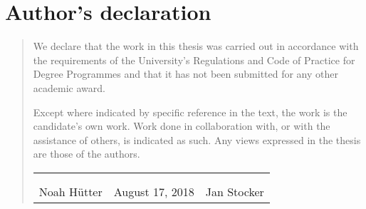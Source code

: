 \chapter*{Author's declaration}
\begin{SingleSpace}
\begin{quote}
We declare that the work in this thesis was carried out in accordance with
the requirements of the University's Regulations and Code of Practice for 
Degree Programmes and that it has not been submitted for any other
academic award.

Except where indicated by specific reference in the text, the
work is the candidate's own work. Work done in collaboration with, or with the
assistance of others, is indicated as such. Any views expressed in the
thesis are those of the authors.

\vspace{3cm}

\begin{table}[h!]
    \centering
    \begin{tabular}{p{5cm} p{3cm} p{5cm}}
         & & \\ \cline{1-1} \cline{3-3} 
        \vspace{1ex} & & \\
        \multicolumn{1}{c}{Noah H\"utter} &
        August 17, 2018
         & \multicolumn{1}{c}{Jan Stocker} \\
    \end{tabular}
\end{table}




\end{quote}
\end{SingleSpace}
\clearpage
